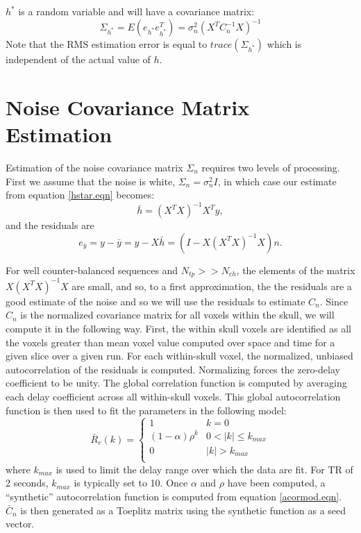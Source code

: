 \documentclass[12pt]{article}
\begin{document}
$h^*$ is a random variable and will have a covariance matrix:
\begin{equation}
\Sigma_{h^*} = E(e_{h^*} e^T_{h^*}) = \sigma_n^2 (X^T C^{-1}_n X)^{-1}
\end{equation}
Note that the RMS estimation error is equal to $trace(\Sigma_{h^*})$
which is independent of the actual value of $h$.

\section{Noise Covariance Matrix Estimation}

Estimation of the noise covariance matrix $\Sigma_n$ requires two
levels of processing.  First we assume that the noise is white,
$\Sigma_n = \sigma_n^2 I$, in which case our estimate from equation
\ref{hstar.eqn} becomes:
\begin{equation}
\bar{h} = (X^T X)^{-1} X^T y,
\label{hbar.eqn}
\end{equation}
and the residuals are
\begin{equation}
e_{\bar{y}} = y - \bar{y} = y - X \bar{h} = (I - X (X^T X)^{-1} X) n.
\label{resbar.eqn}
\end{equation}

For well counter-balanced sequences and $N_{tp}>>N_{ch}$, the elements
of the matrix $X (X^T X)^{-1} X$ are small, and so, to a first
approximation, the the residuals are a good estimate of the noise and
so we will use the residuals to estimate $C_n$.  Since $C_n$ is the
normalized covariance matrix for all voxels within the skull, we will
compute it in the following way.  First, the within skull voxels are
identified as all the voxels greater than mean voxel value computed
over space and time for a given slice over a given run.  For each
within-skull voxel, the normalized, unbiased autocorrelation of the
residuals is computed.  Normalizing forces the zero-delay coefficient
to be unity.  The global correlation function is computed by averaging
each delay coefficient across all within-skull voxels.  This global
autocorrelation function is then used to fit the parameters in the
following model:
\begin{equation}
\bar{R}_e(k) = 
\begin{cases} 
1 & k = 0 \\
(1-\alpha) \rho^k & 0 < |k| \le k_{max}\\
0 & |k| > k_{max}\\
\end{cases} 
\label{acormod.eqn}
\end{equation}
where $k_{max}$ is used to limit the delay range over which the data are
fit.  For TR of 2 seconds, $k_{max}$ is typically set to 10.  Once
$\alpha$ and $\rho$ have been computed, a ``synthetic'' autocorrelation
function is computed from equation \ref{acormod.eqn}.  $\bar{C}_n$ is
then generated as a Toeplitz matrix using the synthetic function as a
seed vector.
\end{document}
